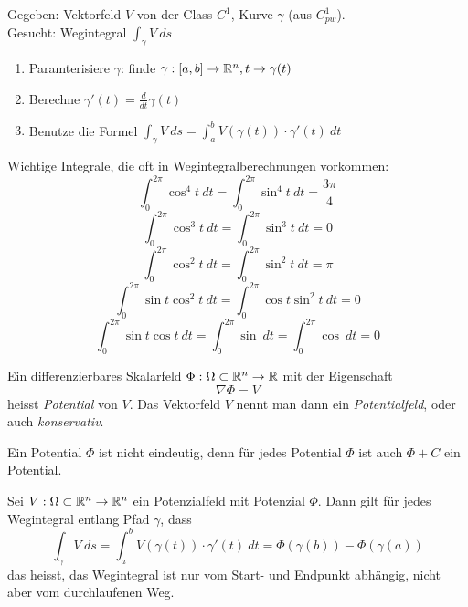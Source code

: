 \begin{concept}[Wegintegral] 
    Gegeben: Vektorfeld $V$ von der Class $C^1$, Kurve $\gamma$ (aus $C^1_{pw}$).\\
    Gesucht: Wegintegral $\int_{\gamma}V \: ds$
    \begin{enumerate}
        \item Paramterisiere $\gamma$: finde $\gamma:[a,b] \to \mathbb{R}^n, t \to \gamma(t)$
        \item Berechne $\gamma'(t) = \frac{d}{dt} \gamma(t)$
        \item Benutze die Formel $\int_{\gamma} V \: ds = \int_a^b V(\gamma(t)) \cdot \gamma'(t) \: dt$
    \end{enumerate}
\end{concept}

\begin{remark}
    Wichtige Integrale, die oft in Wegintegralberechnungen vorkommen:
    $$\int_0^{2\pi}\cos^4t \: dt = \int_0^{2\pi}\sin^4t \: dt = \frac{3\pi}{4}$$
    $$\int_0^{2\pi}\cos^3t \: dt = \int_0^{2\pi}\sin^3t \: dt = 0$$
    $$\int_0^{2\pi}\cos^2t \: dt = \int_0^{2\pi}\sin^2t \: dt = \pi$$
    $$\int_0^{2\pi}\sin t\cos^2t \: dt = \int_0^{2\pi}\cos t\sin^2t \: dt = 0$$
    $$\int_0^{2\pi}\sin t\cos t \: dt = \int_0^{2\pi}\sin \: dt = \int_0^{2\pi}\cos \: dt = 0$$
\end{remark}

\begin{definition} [Potentialfeld]
    Ein differenzierbares Skalarfeld $\Phi: \Omega \subset \mathbb{R}^n \to \mathbb{R}$ mit der Eigenschaft $$\nabla \Phi = V$$ heisst \textit{Potential} von $V$. Das Vektorfeld $V$ nennt man dann ein \textit{Potentialfeld}, oder auch \textit{konservativ}.
\end{definition}

\begin{remark}
    Ein Potential $\Phi$ ist nicht eindeutig, denn für jedes Potential $\Phi$ ist auch $\Phi + C$  ein Potential.
\end{remark}

\begin{theorem}
    Sei $V: \Omega \subset \mathbb{R}^n \to \mathbb{R}^n$ ein Potenzialfeld mit Potenzial $\Phi$. Dann gilt für jedes Wegintegral entlang Pfad $\gamma$, dass
    $$ \int_{\gamma} V \: ds = \int_a^b V(\gamma(t)) \cdot \gamma'(t) \: dt = \Phi(\gamma(b)) - \Phi(\gamma(a))$$ das heisst, das Wegintegral ist nur vom Start- und Endpunkt abhängig, nicht aber vom durchlaufenen Weg.
\end{theorem}


